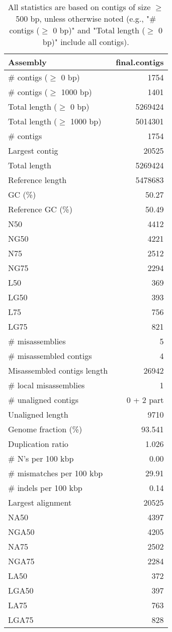 \documentclass[12pt,a4paper]{article}
\begin{document}
\begin{table}[ht]
\begin{center}
\caption{All statistics are based on contigs of size $\geq$ 500 bp, unless otherwise noted (e.g., "\# contigs ($\geq$ 0 bp)" and "Total length ($\geq$ 0 bp)" include all contigs).}
\begin{tabular}{|l*{1}{|r}|}
\hline
Assembly & final.contigs \\ \hline
\# contigs ($\geq$ 0 bp) & 1754 \\ \hline
\# contigs ($\geq$ 1000 bp) & 1401 \\ \hline
Total length ($\geq$ 0 bp) & 5269424 \\ \hline
Total length ($\geq$ 1000 bp) & 5014301 \\ \hline
\# contigs & 1754 \\ \hline
Largest contig & 20525 \\ \hline
Total length & 5269424 \\ \hline
Reference length & 5478683 \\ \hline
GC (\%) & 50.27 \\ \hline
Reference GC (\%) & 50.49 \\ \hline
N50 & 4412 \\ \hline
NG50 & 4221 \\ \hline
N75 & 2512 \\ \hline
NG75 & 2294 \\ \hline
L50 & 369 \\ \hline
LG50 & 393 \\ \hline
L75 & 756 \\ \hline
LG75 & 821 \\ \hline
\# misassemblies & 5 \\ \hline
\# misassembled contigs & 4 \\ \hline
Misassembled contigs length & 26942 \\ \hline
\# local misassemblies & 1 \\ \hline
\# unaligned contigs & 0 + 2 part \\ \hline
Unaligned length & 9710 \\ \hline
Genome fraction (\%) & 93.541 \\ \hline
Duplication ratio & 1.026 \\ \hline
\# N's per 100 kbp & 0.00 \\ \hline
\# mismatches per 100 kbp & 29.91 \\ \hline
\# indels per 100 kbp & 0.14 \\ \hline
Largest alignment & 20525 \\ \hline
NA50 & 4397 \\ \hline
NGA50 & 4205 \\ \hline
NA75 & 2502 \\ \hline
NGA75 & 2284 \\ \hline
LA50 & 372 \\ \hline
LGA50 & 397 \\ \hline
LA75 & 763 \\ \hline
LGA75 & 828 \\ \hline
\end{tabular}
\end{center}
\end{table}
\end{document}
